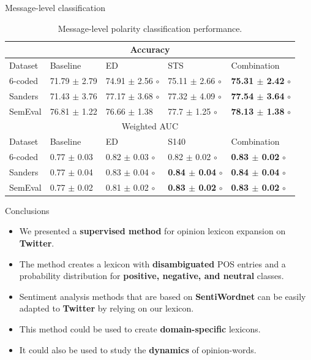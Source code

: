\documentclass[handout]{beamer}
\begin{document}
\begin{frame}{Message-level classification}
\scriptsize
\begin{table}[htbp]
\begin{center}
\begin{tabular}{l|l|l|l|l}
\hline \hline
\multicolumn{ 5}{c}{Accuracy } \\ \hline \hline
Dataset & Baseline & ED & STS & Combination \\ \hline
6-coded & 71.79 $\pm$ 2.79 & 74.91 $\pm$ 2.56 $\circ$ & 75.11 $\pm$ 2.66 $\circ$ &  \textbf{75.31 $\pm$ 2.42} $\circ$ \\ 
Sanders & 71.43 $\pm$ 3.76 & 77.17 $\pm$ 3.68 $\circ$ & 77.32 $\pm$ 4.09 $\circ$ &  \textbf{77.54 $\pm$ 3.64} $\circ$ \\ 
SemEval & 76.81 $\pm$ 1.22 & 76.66 $\pm$ 1.38 & 77.7 $\pm$ 1.25 $\circ$ & \textbf{78.13 $\pm$ 1.38} $\circ$ \\ \hline \hline
\multicolumn{ 5}{c}{Weighted AUC } \\ \hline \hline
Dataset & Baseline & ED & S140 & Combination \\ \hline
6-coded & 0.77 $\pm$ 0.03 & 0.82 $\pm$ 0.03 $\circ$ & 0.82 $\pm$ 0.02 $\circ$ &  \textbf{0.83 $\pm$ 0.02} $\circ$ \\ 
Sanders & 0.77 $\pm$ 0.04 & 0.83 $\pm$ 0.04 $\circ$ & \textbf{0.84 $\pm$ 0.04} $\circ$  & \textbf{0.84 $\pm$ 0.04} $\circ$ \\ 
SemEval & 0.77 $\pm$ 0.02 & 0.81 $\pm$ 0.02 $\circ$ & \textbf{0.83 $\pm$ 0.02} $\circ$ &  \textbf{0.83 $\pm$ 0.02} $\circ$ \\ \hline
\end{tabular}
\caption{Message-level polarity classification performance.}
\label{tab:messclass}
\end{center}
\end{table}
\end{frame}


\begin{frame}{Conclusions}
\begin{scriptsize}
\begin{itemize}
\item We presented a \textbf{supervised method} for opinion lexicon expansion on \textbf{Twitter}. 
\item The method creates a lexicon with \textbf{disambiguated} POS entries and a probability distribution for \textbf{positive, negative, and neutral} classes. 
\item Sentiment analysis methods that are based on \textbf{SentiWordnet} can be easily adapted to \textbf{Twitter} by relying on our lexicon.
\item This method could be used to create \textbf{domain-specific} lexicons.
\item It could also be used to study the \textbf{dynamics} of opinion-words.

\end{itemize}
\end{scriptsize}

\end{frame}
\end{document}
